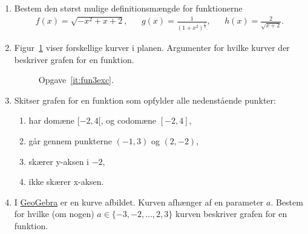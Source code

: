\begin{enumerate}
	\item Bestem den størst mulige definitionsmængde for funktionerne
	\begin{align*}
	f(x)=\sqrt{-x^2+x+2},&& g(x)=\frac{1}{(1+x^2)^\frac{1}{2}},&& h(x)=\frac{2}{\sqrt{x+2}}.
	\end{align*}
	
	\item \label{it:fun3exc} Figur~\ref{fig:fun3exc} viser forskellige kurver i planen. Argumenter for hvilke kurver der beskriver grafen for en funktion. 
	
 	\begin{figure}
		\centering
		\caption{Opgave~\ref{it:fun3exc}.}
		\label{fig:fun3exc}
	\end{figure}

	\item Skitser grafen for en funktion som opfylder alle nedenstående punkter:
	\begin{enumerate}
		\item har domæne $[-2,4[$, og codomæne $[-2,4]$,
		\item går gennem punkterne $(-1,3)$ og $(2,-2)$,
		\item skærer y-aksen i $-2$,
		\item ikke skærer x-aksen.
		\end{enumerate}
	\item I \href{https://www.geogebra.org/m/eEE7RXzU}{GeoGebra} er en kurve afbildet. Kurven afhænger af en parameter $a$. Bestem for hvilke (om nogen) $a\in \{-3,-2,\dots,2,3\}$ kurven beskriver grafen for en funktion.
\end{enumerate}